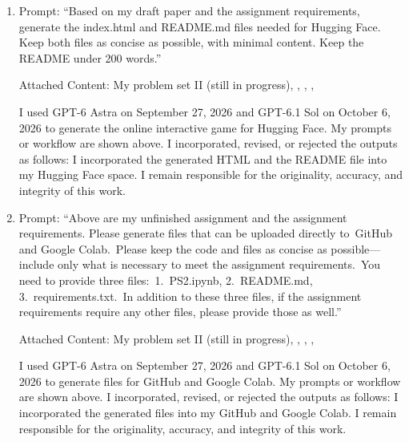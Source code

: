 \begin{enumerate}[label=\arabic*.,leftmargin=*,itemsep=2pt]
I used GPT-6 Astra on September 27, 2026 and GPT-6.1 Sol on October 6, 2026 to generate the teaser figure. My prompts or workflow are shown above. I incorporated, revised, or rejected the outputs as follows: I incorporated the teaser figure generated by AI into my essay. I remain responsible for the originality, accuracy, and integrity of this work.

\item
Prompt: ``Based on my draft paper and the assignment requirements, generate the index.html and README.md files needed for Hugging Face. Keep both files as concise as possible, with minimal content. Keep the README under 200 words.''

Attached Content: My problem set II (still in progress), , , , 

I used GPT-6 Astra on September 27, 2026 and GPT-6.1 Sol on October 6, 2026 to generate the online interactive game for Hugging Face. My prompts or workflow are shown above. I incorporated, revised, or rejected the outputs as follows: I incorporated the generated HTML and the README file into my Hugging Face space. I remain responsible for the originality, accuracy, and integrity of this work.

\item
Prompt: ``Above are my unfinished assignment and the assignment requirements. Please generate files that can be uploaded directly to~GitHub and Google Colab.~Please keep the code and files as concise as possible---include only what is necessary to meet the assignment requirements.~You need to provide three files:~1.~PS2.ipynb, 2.~README.md, 3.~requirements.txt.~In addition to these three files, if the assignment requirements require any other files, please provide those as well.''

Attached Content: My problem set II (still in progress), , , , 

I used GPT-6 Astra on September 27, 2026 and GPT-6.1 Sol on October 6, 2026 to generate files for GitHub and Google Colab. My prompts or workflow are shown above. I incorporated, revised, or rejected the outputs as follows: I incorporated the generated files into my GitHub and Google Colab. I remain responsible for the originality, accuracy, and integrity of this work.


\end{enumerate}
